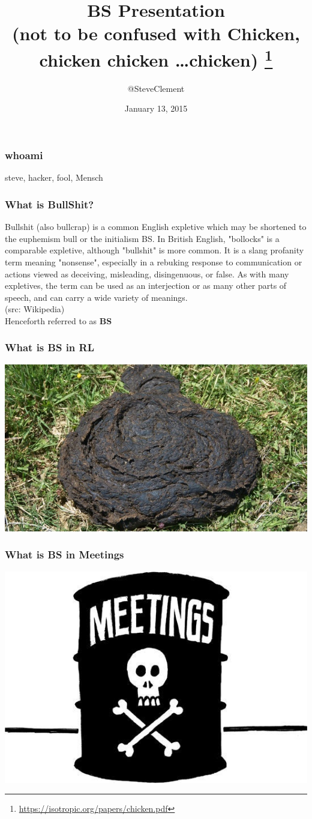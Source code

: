 \documentclass[a4paper]{beamer}
\title{BS Presentation\\(not to be confused with Chicken, chicken chicken \ldots  chicken) \footnote{\url{https://isotropic.org/papers/chicken.pdf}}}
\author{@SteveClement}
\date{January 13, 2015}
\begin{document}

\frame{\titlepage} 


\begin{frame}
\frametitle{whoami} 
steve, hacker, fool, Mensch
\end{frame}

\begin{frame}
\frametitle{What is BullShit?} 
Bullshit (also bullcrap) is a common English expletive which may be shortened to the euphemism bull or the initialism BS. In British English, "bollocks" is a comparable expletive, although "bullshit" is more common. It is a slang profanity term meaning "nonsense", especially in a rebuking response to communication or actions viewed as deceiving, misleading, disingenuous, or false. As with many expletives, the term can be used as an interjection or as many other parts of speech, and can carry a wide variety of meanings. \\ (src: Wikipedia)
\\
Henceforth referred to as {\bf BS}

\end{frame}

\begin{frame}
\frametitle{What is BS in RL}
\includegraphics[scale=0.60]{img/cowpat.jpg}
\end{frame}

\begin{frame}
\frametitle{What is BS in Meetings} 
\includegraphics[scale=0.60]{img/Image-00047.jpeg}
\end{frame}
\end{document}
